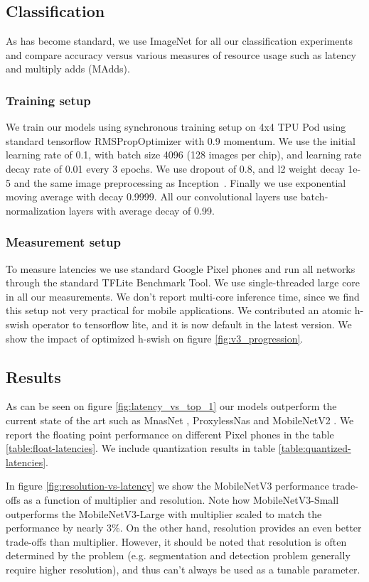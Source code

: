 \documentclass[10pt,twocolumn,letterpaper]{article}
\begin{document}
\subsection{Classification}
As has become standard, we use ImageNet\cite{russakovsky:2015:ILS:2846547.2846559} for all our classification experiments and compare accuracy versus various measures of resource usage such as latency and multiply adds (MAdds).  
\subsubsection{Training setup}
We train our models using synchronous training setup  on
4x4 TPU Pod \cite{tpu-intro} using standard tensorflow RMSPropOptimizer with 0.9 momentum. We use the initial learning rate of 0.1, with batch size 4096 (128 images per chip), and learning rate decay rate of 0.01 every 3 epochs. We use dropout of 0.8, and l2 weight decay 1e-5 and the same image preprocessing as Inception~\cite{InceptionV4}. Finally we use exponential moving average with decay 0.9999. All our convolutional layers use batch-normalization layers with average decay of 0.99. 

\subsubsection{Measurement setup}
To measure latencies we use standard Google Pixel phones and run all networks through the standard TFLite
Benchmark Tool. We use single-threaded large core in all our measurements. We don't report multi-core inference
time, since we find this setup not very practical for mobile applications. We contributed an atomic h-swish
operator to tensorflow lite, and it is now default in the latest version. We show the impact of optimized 
h-swish on figure \ref{fig:v3_progression}.

\subsection{Results}
As can be seen on figure \ref{fig:latency_vs_top_1} our models outperform the current state of the art such as
MnasNet \cite{mnasnet}, ProxylessNas \cite{proxyless}
and MobileNetV2 \cite{mobilenetv2}. We report the floating point performance on different Pixel phones in the
table \ref{table:float-latencies}. We include quantization results in table \ref{table:quantized-latencies}.

In figure \ref{fig:resolution-vs-latency} we show the MobileNetV3 performance trade-offs as a function of
multiplier and resolution.
Note how MobileNetV3-Small outperforms the MobileNetV3-Large with multiplier scaled to match the performance by
nearly 3\%. On the
other hand, resolution provides an even better trade-offs than multiplier. However, it should be noted that resolution is often determined by the 
problem (e.g. segmentation and detection problem generally require higher resolution), and thus can't always be used as a tunable parameter. 
\end{document}
